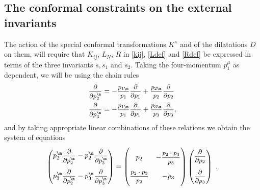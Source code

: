 \documentclass[a4paper,11pt,openright,twoside]{book}
\newcommand{\sdfrac}[2]{\mbox{\small$\displaystyle\frac{#1}{#2}$}}
\numberwithin{equation}{section}
\begin{document}
{{\subsection{The conformal constraints on the external invariants}
The action of the special conformal transformations $K^\kappa$ and of the dilatations $D$ on them, will require that $K_{ij}$, $L_N$, $R$ in \eqref{kij}, \eqref{Ldef} and \eqref{Rdef} be expressed in terms of the three invariants $s, s_1$ and $s_2$.  Taking the four-momentum $p_1^\mu$ as dependent, we will be using the chain rules
\begin{align}
	\sdfrac{\partial}{\partial p_2^\m}&=-\sdfrac{p_{1\m}}{p_1}\sdfrac{\partial}{\partial p_1}+\sdfrac{p_{2\m}}{p_2}\sdfrac{\partial}{\partial p_2}\\
	\sdfrac{\partial}{\partial p_3^\m}&=-\sdfrac{p_{1\m}}{p_1}\sdfrac{\partial}{\partial p_1}+\sdfrac{p_{3\m}}{p_3}\sdfrac{\partial}{\partial p_3},
\end{align}
and by taking appropriate linear combinations of these relations we obtain the system of equations
\begin{equation}
	\begin{pmatrix}
		p_2^\m\sdfrac{\partial}{\partial p_2^\m}-p_2^\m\sdfrac{\partial}{\partial p_3^\m}\\[3ex]
		p_3^\m\sdfrac{\partial}{\partial p_2^\m}-p_3^\m\sdfrac{\partial}{\partial p_3^\m}
	\end{pmatrix}=
	\begin{pmatrix}
		&\\[-1ex]
		p_2& -\sdfrac{p_2\cdot p_3}{p_3}\\[3ex]
		\sdfrac{p_2\cdot p_3}{p_2}&-p_3\\[2ex]
	\end{pmatrix} \begin{pmatrix}
		\sdfrac{\partial}{\partial p_2}\\[3ex]
		\sdfrac{\partial}{\partial p_3}
	\end{pmatrix}\ .
\end{equation}

}}
\end{document}
